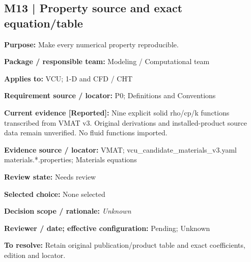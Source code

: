 \documentclass[11pt]{article}
\begin{document}
\par\noindent\begin{minipage}{\textwidth}\small\setlength{\parskip}{2pt}
\subsection*{M13 | Property source and exact equation/table}
\textbf{Purpose:} Make every numerical property reproducible.\par
\textbf{Package / responsible team:} Modeling / Computational team\par
\textbf{Applies to:} VCU; 1-D and CFD / CHT\par
\textbf{Requirement source / locator:} P0; Definitions and Conventions\par
\textbf{Current evidence [Reported]:} Nine explicit solid rho/cp/k functions transcribed from VMAT v3. Original derivations and installed-product source data remain unverified. No fluid functions imported.\par
\textbf{Evidence source / locator:} VMAT; vcu\_\allowbreak{}candidate\_\allowbreak{}materials\_\allowbreak{}v3.yaml materials.*.properties; Materials equations\par
\textbf{Review state:} Needs review\par
\textbf{Selected choice:} None selected\par
\textbf{Decision scope / rationale:} \textit{Unknown}\par
\textbf{Reviewer / date; effective configuration:} Pending; Unknown\par
\textbf{To resolve:} Retain original publication/product table and exact coefficients, edition and locator.\par
\end{minipage}\par\vspace{5pt}
\end{document}
